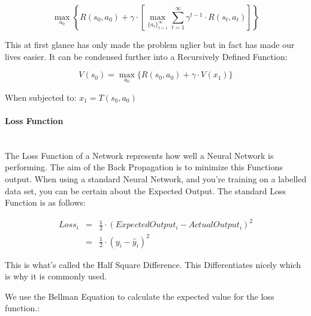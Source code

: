 \begin{flushleft}
                    \[ \max_{a_{0}} \left\{ R(s_0, a_0) + \gamma \cdot \left[ \max_{\{a_{t}\}_{t=1}^{\infty}} \sum_{t=1}^{\infty} \gamma^{t-1} \cdot R(s_{t},a_{t})\right] \right\} \]
                    \vspace{0.2cm}

                    This at first glance has only made the problem uglier but in fact has made our lives easier. It can be condensed further into a Recursively Defined Function:
                    \vspace{0.2cm}

                    \[ V(s_{0}) = \max_{a_{0}} \{ R(s_{0}, a_{0}) + \gamma \cdot V(x_{1}) \} \] 
                    \centerline{When subjected to: $ x_{1} = T(s_{0}, a_{0})$}
                    \vspace{0.2cm}

                \paragraph{Loss Function} \mbox{} \\
                    The Loss Function of a Network represents how well a Neural Network is performing. The aim of the Back Propagation is to minimize this Functions output. When using
                    a standard Neural Network, and you're training on a labelled data set, you can be certain about the Expected Output. The standard Loss Function is as follows: \\ 
                    \vspace{0.2cm}
                    
                    \begin{eqnarray*}
                        Loss_{i} &=& \frac{1}{2} \cdot (Expected Output_{i} - Actual Output_{i})^{2} \\
                        &=& \frac{1}{2} \cdot (y_{i} - \hat{y}_{i})^{2}
                    \end{eqnarray*}
                    \vspace{0.2cm}

                    This is what's called the Half Square Difference. This Differentiates nicely which is why it is commonly used. \\
                    \vspace{0.2cm}

                    We use the Bellman Equation to calculate the expected value for the loss function.: \\
                    \vspace{0.2cm}


\end{flushleft}
